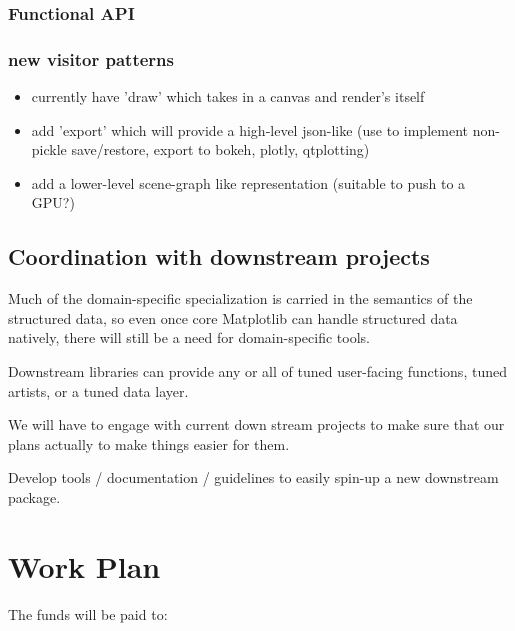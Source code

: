 \documentclass[11pt]{article}  %
\begin{document}
\subsubsection{Functional API}


\subsubsection{new visitor patterns}

\begin{itemize}
\item currently have 'draw' which takes in a canvas and render's itself
\item add 'export' which will provide a high-level json-like (use to
  implement non-pickle save/restore, export to {bokeh, plotly,
    qtplotting})
\item add a lower-level scene-graph like representation (suitable to push to a GPU?)
\end{itemize}

\subsection{Coordination with downstream projects}

Much of the domain-specific specialization is carried in the semantics
of the structured data, so even once core Matplotlib can handle structured
data natively, there will still be a need for domain-specific tools.

Downstream libraries can provide any or all of tuned user-facing
functions, tuned artists, or a tuned data layer.

We will have to engage with current down stream projects to make sure
that our plans actually to make things easier for them.

Develop tools / documentation / guidelines to easily spin-up a new
downstream package.


\section{Work Plan}

The funds will be paid to:
\end{document}
